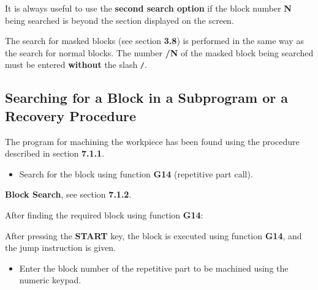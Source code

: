 \vspace{.5cm}

\notes

It is always useful to use the \textbf{second search option} if the block number \textbf{N} being searched is beyond the section displayed on the screen.

The search for masked blocks (see section \textbf{3.8}) is performed in the same way as the search for normal blocks.  
The number \textbf{/N} of the masked block being searched must be entered \textbf{without} the slash \texttt{/}.

\newpage

\subsection{Searching for a Block in a Subprogram or a Recovery Procedure}

The program for machining the workpiece has been found using the procedure described in section \textbf{7.1.1}.

\begin{itemize}
    \item Search for the block using function \textbf{G14} (repetitive part call).
\end{itemize}

\textbf{Block Search}, see section \textbf{7.1.2}.

After finding the required block using function \textbf{G14}:

\begin{itemize}
\end{itemize}
\vspace{.5cm}
\begin{itemize}
\end{itemize}

After pressing the \textbf{START} key, the block is executed using function \textbf{G14}, and the jump instruction is given.

\begin{itemize}
    \item Enter the block number of the repetitive part to be machined using the numeric keypad.
\end{itemize}

\begin{itemize}
\end{itemize}
\vspace{.5cm}
\begin{itemize}
\end{itemize}

